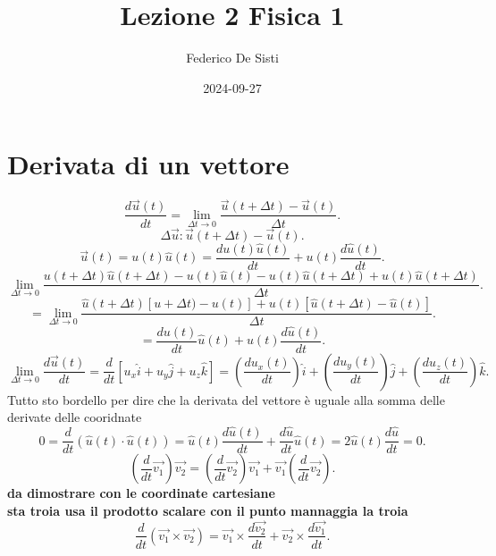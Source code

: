 \documentclass[12px]{article}
\title{Lezione 2 Fisica 1}
\date{2024-09-27}
\author{Federico De Sisti}
\begin{document}
	\maketitle
	\newpage
	\section{Derivata di un vettore}
	 \[
		 \frac{d \overrightarrow{u}(t)}{dt} = \lim_{\Delta t \rightarrow 0} \frac{ \overrightarrow{u}(t + \Delta t) - \overrightarrow{u}(t)}{\Delta t}
	.\] 
	\[
	\Delta \overrightarrow{u} : \overrightarrow{u}(t + \Delta t) - \overrightarrow{u} (t)
	.\] 
	\[
		\overrightarrow{u}(t) = u(t)\hat{u}(t) = \frac{du(t)\hat u(t)}{dt} + u(t)\frac {d \hat u (t)}{dt}
	.\] 
	\[
		\lim_{\Delta t \rightarrow 0} \frac{u(t + \Delta t)\hat u (t + \Delta t) - u(t)\hat u (t) - u(t)\hat u(t + \Delta t) + u(t)\hat u (t + \Delta t)}{\Delta t}
	.\] 
	\[
	= \lim_{\Delta t \rightarrow 0} \frac{\hat u (t + \Delta t)[u + \Delta t) - u(t)] + u(t)[\hat u (t + \Delta t) - \hat u (t)]}{\Delta t}
	.\] 
	\[
		= \frac {du(t)}{dt} \hat u(t) + u(t) \frac{d\hat u(t)}{dt}
	.\] 
	\[
		\lim_{\Delta t \rightarrow 0} \frac{d \overrightarrow{u}(t)}{dt}= \frac{d}{dt} [u_x\hat i + u_y \hat j + u_z \hat k] = \left(\frac{du_x(t)}{dt}\right)\hat i + \left(\frac{du_y(t)}{dt}\right)\hat j + \left(\frac{du_z(t)}{dt}\right) \hat k
	.\] 
	Tutto sto bordello per dire che la derivata del vettore è uguale alla somma delle derivate delle cooridnate
	\[
		0 = \frac{d}{dt}(\hat u (t)\cdot \hat u (t)) = \hat u(t)\frac{d\hat u(t)}{dt} + \frac{d\hat u }{dt}\hat u(t) = 2\hat u (t)\frac{d\hat u}{dt} = 0
	.\] 
	\[
		\left(\frac {d} {dt} \overrightarrow{v_1}\right) \overrightarrow{v_2}= \left(\frac {d}{dt} \overrightarrow{v_2}\right) \overrightarrow{v_1} + \overrightarrow{v_1}\left(\frac{d}{dt} \overrightarrow{v_2}\right)
	.\] 
	\textbf{da dimostrare con le coordinate cartesiane}\\
	\textbf{sta troia usa il prodotto scalare con il punto mannaggia la troia}
	\[
		\frac {d}{dt} (\overrightarrow{ v_1}\times \overrightarrow{v_2}) = \overrightarrow{v_1}\times \frac{d \overrightarrow{v_2}}{dt} + \overrightarrow{v_2}\times \frac{d \overrightarrow{v_1}}{dt}
	.\] 
\end{document}
